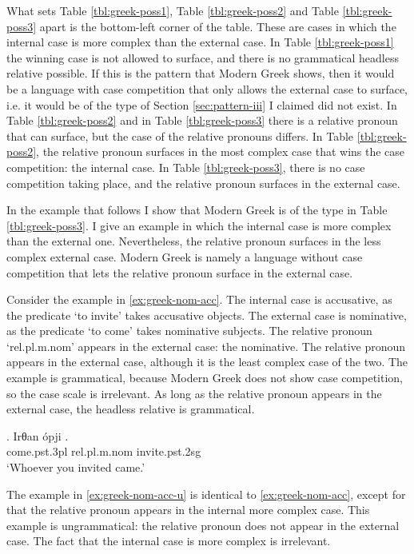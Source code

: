 What sets Table \ref{tbl:greek-poss1}, Table \ref{tbl:greek-poss2} and Table \ref{tbl:greek-poss3} apart is the bottom-left corner of the table. These are cases in which the internal case is more complex than the external case.
In Table \ref{tbl:greek-poss1} the winning case is not allowed to surface, and there is no grammatical headless relative possible. If this is the pattern that Modern Greek shows, then it would be a language with case competition that only allows the external case to surface, i.e. it would be of the type of Section \ref{sec:pattern-iii} I claimed did not exist.
In Table \ref{tbl:greek-poss2} and in Table \ref{tbl:greek-poss3} there is a relative pronoun that can surface, but the case of the relative pronouns differs. In Table \ref{tbl:greek-poss2}, the relative pronoun surfaces in the most complex case that wins the case competition: the internal case. In Table \ref{tbl:greek-poss3}, there is no case competition taking place, and the relative pronoun surfaces in the external case.

In the example that follows I show that Modern Greek is of the type in Table \ref{tbl:greek-poss3}. I give an example in which the internal case is more complex than the external one. Nevertheless, the relative pronoun surfaces in the less complex external case. Modern Greek is namely a language without case competition that lets the relative pronoun surface in the external case.

Consider the example in \ref{ex:greek-nom-acc}.
The internal case is accusative, as the predicate  `to invite' takes accusative objects.
The external case is nominative, as the predicate  `to come' takes nominative subjects.
The relative pronoun  `\ac{rel}.\ac{pl}.\ac{m}.\ac{nom}' appears in the external case: the nominative.
The relative pronoun appears in the external case, although it is the least complex case of the two. The example is grammatical, because Modern Greek does not show case competition, so the case scale is irrelevant. As long as the relative pronoun appears in the external case, the headless relative is grammatical.

\exg. Irθan ópji .\\
come.\ac{pst}.3\ac{pl}\scsub{[nom]} \ac{rel}.\ac{pl}.\ac{m}.\ac{nom} invite.\ac{pst}.2\ac{sg}\scsub{[acc]}\\
`Whoever you invited came.'\label{ex:greek-nom-acc}

The example in \ref{ex:greek-nom-acc-u} is identical to \ref{ex:greek-nom-acc}, except for that the relative pronoun appears in the internal  more complex case. This example is ungrammatical: the relative pronoun does not appear in the external case. The fact that the internal case is more complex is irrelevant.

